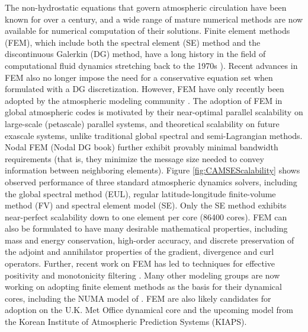 \documentclass[11pt]{article}
\begin{document}
The non-hydrostatic equations that govern atmospheric circulation have been known for over a century, and a wide range of mature numerical methods are now available for numerical computation of their solutions.  Finite element methods (FEM), which include both the spectral element (SE) method and the discontinuous Galerkin (DG) method, have a long history in the field of computational fluid dynamics stretching back to the 1970s \citep{patera:84,maday:89,FBSR1997JCP,BCCWS1998JCP}).  Recent advances in FEM \citep{huynh2007flux, ullrich2014global} also no longer impose the need for a conservative equation set when formulated with a DG discretization.  However, FEM have only recently been adopted by the atmospheric modeling community \citep{taylor:97,FXGJSHTW2002JCP,FXGTER2004MWR,AFMTJT2004MWR,NTL2005MWR,FXGMR2008JCP,JFKFXG2012JCP}.  The adoption of FEM in global atmospheric codes is motivated by their near-optimal parallel scalability on large-scale (petascale) parallel systems, and theoretical scalability on future exascale systems, unlike traditional global spectral and semi-Lagrangian methods.   Nodal FEM {\color{red}(Nodal DG book)} further exhibit provably minimal bandwidth requirements (that is, they minimize the message size needed to convey information between neighboring elements).  Figure \ref{fig:CAMSEScalability} shows observed performance of three standard atmospheric dynamics solvers, including the global spectral method (EUL), regular latitude-longitude finite-volume method (FV) and spectral element model (SE).  Only the SE method exhibits near-perfect scalability down to one element per core (86400 cores).  FEM can also be formulated to have many desirable mathematical properties, including mass and energy conservation, high-order accuracy, and discrete preservation of the adjoint and annihilator properties of the gradient, divergence and curl operators.  Further, recent work on FEM has led to techniques for effective positivity and monotonicity filtering \citep{OGMATASC2013}.  Many other modeling groups are now working on adopting finite element methods as the basis for their dynamical cores, including the NUMA model of \cite{JFKFXG2012JCP}.  FEM are also likely candidates for adoption on the U.K. Met Office dynamical core and the upcoming model from the Korean Institute of Atmospheric Prediction Systems (KIAPS).
\end{document}
